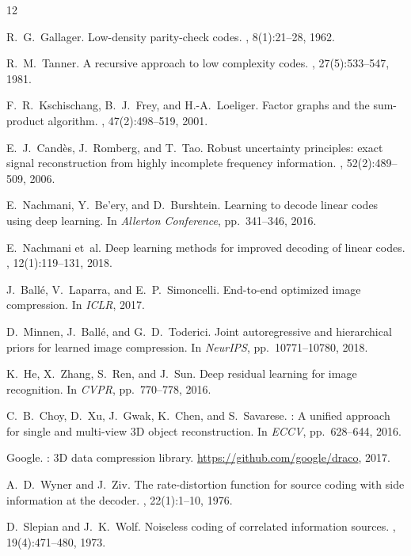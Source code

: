 \documentclass[11pt,a4paper]{article}
\begin{document}

\begin{thebibliography}{12}

R.~G.~Gallager.
\newblock Low-density parity-check codes.
, 8(1):21--28, 1962.

R.~M.~Tanner.
\newblock A recursive approach to low complexity codes.
, 27(5):533--547, 1981.

F.~R.~Kschischang, B.~J.~Frey, and H.-A.~Loeliger.
\newblock Factor graphs and the sum-product algorithm.
, 47(2):498--519, 2001.

E.~J.~Cand\`{e}s, J.~Romberg, and T.~Tao.
\newblock Robust uncertainty principles: exact signal reconstruction from
  highly incomplete frequency information.
, 52(2):489--509, 2006.

E.~Nachmani, Y.~Be'ery, and D.~Burshtein.
\newblock Learning to decode linear codes using deep learning.
\newblock In {\em Allerton Conference}, pp.~341--346, 2016.

E.~Nachmani et~al.
\newblock Deep learning methods for improved decoding of linear codes.
, 12(1):119--131, 2018.

J.~Ball\'{e}, V.~Laparra, and E.~P.~Simoncelli.
\newblock End-to-end optimized image compression.
\newblock In {\em ICLR}, 2017.

D.~Minnen, J.~Ball\'{e}, and G.~D.~Toderici.
\newblock Joint autoregressive and hierarchical priors for learned image
  compression.
\newblock In {\em NeurIPS}, pp.~10771--10780, 2018.

K.~He, X.~Zhang, S.~Ren, and J.~Sun.
\newblock Deep residual learning for image recognition.
\newblock In {\em CVPR}, pp.~770--778, 2016.

C.~B.~Choy, D.~Xu, J.~Gwak, K.~Chen, and S.~Savarese.
: A unified approach for single and multi-view 3D object
  reconstruction.
\newblock In {\em ECCV}, pp.~628--644, 2016.

Google.
: 3D data compression library.
\newblock \url{https://github.com/google/draco}, 2017.

A.~D.~Wyner and J.~Ziv.
\newblock The rate-distortion function for source coding with side information
  at the decoder.
, 22(1):1--10, 1976.

D.~Slepian and J.~K.~Wolf.
\newblock Noiseless coding of correlated information sources.
, 19(4):471--480, 1973.

\end{thebibliography}
\end{document}

